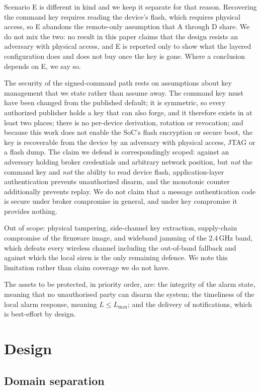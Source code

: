 Scenario E is different in kind and we keep it separate for that reason. Recovering the command
key requires reading the device's flash, which requires physical access, so E abandons the
remote-only assumption that A through D share. We do not mix the two: no result in this paper
claims that the design resists an adversary with physical access, and E is reported only to
show what the layered configuration does and does not buy once the key is gone. Where a
conclusion depends on E, we say so.

The security of the signed-command path rests on assumptions about key management that we state
rather than assume away. The command key must have been changed from the published default; it
is symmetric, so every authorized publisher holds a key that can also forge, and it therefore
exists in at least two places; there is no per-device derivation, rotation or revocation; and
because this work does not enable the SoC's flash encryption or secure boot, the key is
recoverable from the device by an adversary with physical access, JTAG or a flash dump. The
claim we defend is correspondingly scoped: against an adversary holding broker credentials and
arbitrary network position, but \emph{not} the command key and \emph{not} the ability to read
device flash, application-layer authentication prevents unauthorized disarm, and the monotonic
counter additionally prevents replay. We do not claim that a message authentication code is
secure under broker compromise in general, and under key compromise it provides nothing.

Out of scope: physical tampering, side-channel key extraction, supply-chain compromise of the
firmware image, and wideband jamming of the 2.4\,GHz band, which defeats every wireless channel
including the out-of-band fallback and against which the local siren is the only remaining
defence. We note this limitation rather than claim coverage we do not have.

The assets to be protected, in priority order, are: the integrity of the alarm state, meaning
that no unauthorised party can disarm the system; the timeliness of the local alarm response,
meaning $L \le L_{\max}$; and the delivery of notifications, which is best-effort by design.

\section{Design}\label{sec:design}

\subsection{Domain separation}

